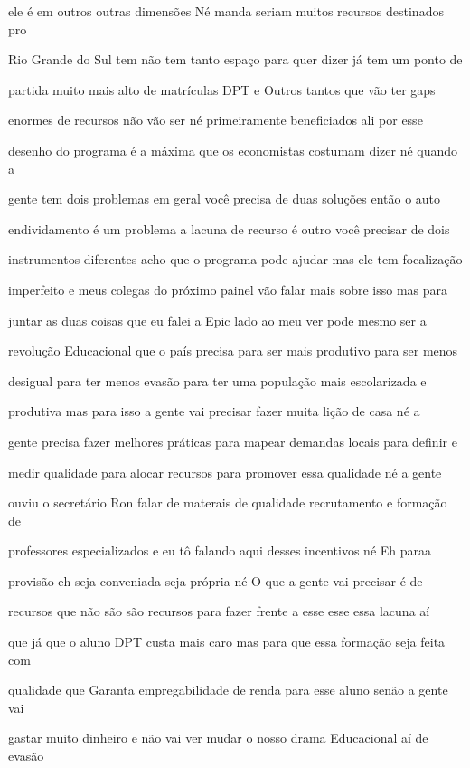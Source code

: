 \documentclass[a4paper,12pt]{article}
\begin{document}
ele é em outros outras dimensões Né manda seriam muitos recursos destinados pro

Rio Grande do Sul tem não tem tanto espaço para quer dizer já tem um ponto de

partida muito mais alto de matrículas DPT e Outros tantos que vão ter gaps

enormes de recursos não vão ser né primeiramente beneficiados ali por esse

desenho do programa é a máxima que os economistas costumam dizer né quando a

gente tem dois problemas em geral você precisa de duas soluções então o auto

endividamento é um problema a lacuna de recurso é outro você precisar de dois

instrumentos diferentes acho que o programa pode ajudar mas ele tem focalização

imperfeito e meus colegas do próximo painel vão falar mais sobre isso mas para

juntar as duas coisas que eu falei a Epic lado ao meu ver pode mesmo ser a

revolução Educacional que o país precisa para ser mais produtivo para ser menos

desigual para ter menos evasão para ter uma população mais escolarizada e

produtiva mas para isso a gente vai precisar fazer muita lição de casa né a

gente precisa fazer melhores práticas para mapear demandas locais para definir e

medir qualidade para alocar recursos para promover essa qualidade né a gente

ouviu o secretário Ron falar de materais de qualidade recrutamento e formação de

professores especializados e eu tô falando aqui desses incentivos né Eh paraa

provisão eh seja conveniada seja própria né O que a gente vai precisar é de

recursos que não são são recursos para fazer frente a esse esse essa lacuna aí

que já que o aluno DPT custa mais caro mas para que essa formação seja feita com

qualidade que Garanta empregabilidade de renda para esse aluno senão a gente vai

gastar muito dinheiro e não vai ver mudar o nosso drama Educacional aí de evasão
\end{document}
